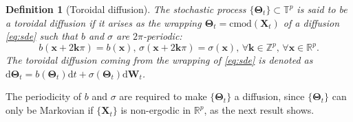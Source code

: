 \documentclass[oneside,11pt]{article}
\newcommand{\R}{\mathbb{R}}
\newcommand{\T}{\mathbb{T}}
\newcommand{\Z}{\mathbb{Z}}
\newcommand{\rd}{\mathrm{d}}
\newcommand{\bx}{\mathbf{x}}
\newcommand{\bX}{\mathbf{X}}
\newcommand{\bk}{\mathbf{k}}
\newcommand{\bTheta}{\boldsymbol\Theta}
\newcommand{\bW}{\mathbf{W}}
\newcommand{\cmod}[1]{\mathrm{cmod}\left(#1\right)}
\newtheorem{defin}{Definition}
\begin{document}
\begin{defin}[Toroidal diffusion]
\label{def:tordi}
The stochastic process $\{\bTheta_t\}\subset\T^p$ is said to be a \emph{toroidal diffusion} if it arises as the wrapping $\bTheta_t=\cmod{\bX_t}$ of a diffusion \eqref{eq:sde} such that $b$ and $\sigma$ are $2\pi$-periodic:
\[
b(\bx+2\bk\pi)=b(\bx),\,\sigma(\bx+2\bk\pi)=\sigma(\bx),\,\forall\bk\in\Z^p,\,\forall\bx\in\R^p.
\]
The toroidal diffusion coming from the wrapping of \eqref{eq:sde} is denoted as $\rd \bTheta_t=b(\bTheta_t)\rd t+\sigma(\bTheta_t)\rd \bW_t$.
\end{defin}

The periodicity of $b$ and $\sigma$ are required to make $\{\bTheta_t\}$ a diffusion, since $\{\bTheta_t\}$ can only be Markovian if $\{\bX_t\}$ is non-ergodic in $\R^p$, as the next result shows.
\end{document}
